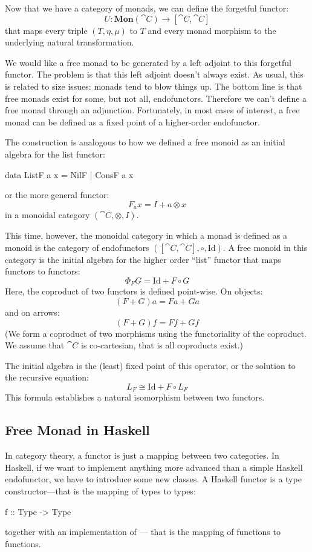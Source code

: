 \documentclass[DaoFP]{subfiles}
\begin{document}
Now that we have a category of monads, we can define the forgetful functor:
\[ U \colon \mathbf{Mon}(\cat C) \to [\cat C, \cat C] \]
that maps every triple $(T, \eta, \mu)$ to $T$ and every monad morphism to the underlying natural transformation.

We would like a free monad to be generated by a left adjoint to this forgetful functor. The problem is that this left adjoint doesn't always exist. As usual, this is related to size issues: monads tend to blow things up. The bottom line is that free monads exist for some, but not all, endofunctors. Therefore we can't define a free monad through an adjunction. Fortunately, in most cases of interest, a free monad can be defined as a fixed point of a higher-order endofunctor. 

The construction is analogous to how we defined a free monoid as an initial algebra for the list functor:
\begin{haskell}
data ListF a x = NilF | ConsF a x
\end{haskell}
or the more general functor:
\[ F_a x = I + a \otimes x \]
in a monoidal category $(\cat C, \otimes, I)$.

This time, however, the monoidal category in which a monad is defined as a monoid is the category of endofunctors $([\cat C, \cat C], \circ, \text{Id})$. A free monoid in this category is the initial algebra for the higher order ``list'' functor that maps functors to functors:
\[ \Phi_F G = \text{Id} + F \circ G \]
Here, the coproduct of two functors is defined point-wise. On objects:
\[ (F + G) a = F a + G a \]
and on arrows:
\[ (F + G) f = F f + G f \]
(We form a coproduct of two morphisms using the functoriality of the coproduct. We assume that $\cat C$ is co-cartesian, that is all coproducts exist.)


The initial algebra is the (least) fixed point of this operator, or the solution to the recursive equation:
\[ L_F \cong \text{Id} + F \circ L_F \]
This formula establishes a natural isomorphism between two functors. 



\subsection{Free Monad in Haskell}

In category theory, a functor is just a mapping between two categories. In Haskell, if we want to implement anything more advanced than a simple Haskell endofunctor, we have to introduce some new classes. A Haskell functor is a type constructor---that is the mapping of types to types:
\begin{haskell}
f :: Type -> Type
\end{haskell}
together with an implementation of --- that is the mapping of functions to functions. 
\end{document}
